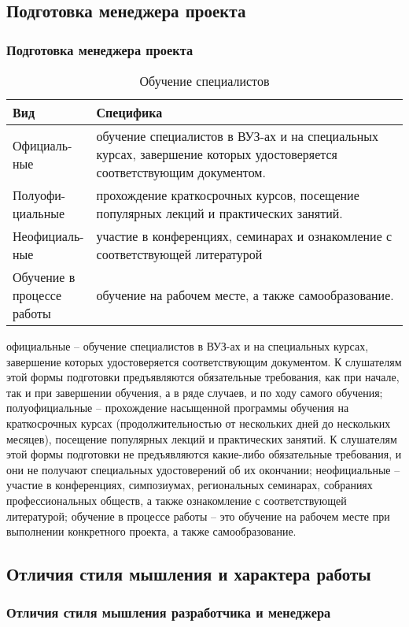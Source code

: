 \documentclass{../industrial-development}
\begin{document}
\subsection{Подготовка менеджера проекта}
\begin{frame} \frametitle{Подготовка менеджера проекта}

	 	\begin{table}[H]
\caption{\label{tab:canonsummary} Обучение специалистов}
\begin{center}
\begin{tabular}{|p{0.2\linewidth}|p{0.8\linewidth}|}
\hline
\textbf{Вид} & \textbf{Специфика} \\
\hline
Официаль-ные &  обучение специалистов в ВУЗ-ах и на специальных курсах, завершение которых удостоверяется соответствующим документом. \\
\hline
Полуофи-циальные  & прохождение краткосрочных курсов, посещение популярных лекций и практических занятий. \\
\hline
Неофициаль-ные &  участие в конференциях, семинарах и ознакомление с соответствующей литературой \\
\hline
Обучение в процессе работы & обучение на рабочем месте, а также самообразование. \\
\hline
\end{tabular}
\end{center}
\end{table} 
\end{frame}
\lecturenotes
официальные – обучение специалистов в ВУЗ-ах и на специальных курсах, завершение которых удостоверяется соответствующим документом. К слушателям этой формы подготовки предъявляются обязательные требования, как при начале, так и при завершении обучения, а в ряде случаев, и по ходу самого обучения;
полуофициальные – прохождение насыщенной программы обучения на краткосрочных курсах (продолжительностью от нескольких дней до нескольких месяцев), посещение популярных лекций и практических занятий. К слушателям этой формы подготовки не предъявляются какие-либо обязательные требования, и они не получают специальных удостоверений об их окончании;
неофициальные – участие в конференциях, симпозиумах, региональных семинарах, собраниях профессиональных обществ, а также ознакомление с соответствующей литературой;
обучение в процессе работы – это обучение на рабочем месте при выполнении конкретного проекта, а также самообразование.
~\cite{How_to_be_a_good_IT-manager}
\subsection{Отличия стиля мышления и характера работы}
\begin{frame} \frametitle{Отличия стиля мышления разработчика и менеджера}

\end{frame}
\lecturenotes
\end{document}
